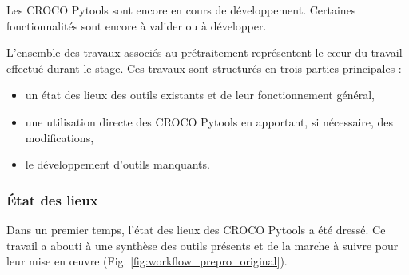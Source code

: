 \documentclass[10pt,a4paper,titlepage]{article}
\begin{document}
    Les CROCO Pytools sont encore en cours de développement. %
    Certaines fonctionnalités sont encore à valider ou à développer.
    
    
    
    L'ensemble des travaux associés au prétraitement représentent le c\oe{}ur du travail effectué durant le stage.
    Ces travaux sont structurés en trois parties principales :
    \begin{itemize}
        \item un état des lieux des outils existants et de leur fonctionnement général,
        \item une utilisation directe des CROCO Pytools en apportant, si nécessaire, des modifications,
        \item le développement d'outils manquants.
    \end{itemize}
    
    \subsubsection{État des lieux}
    \label{subsub:etat_des_lieux}
    
    Dans un premier temps, l'état des lieux des CROCO Pytools a été dressé.
    Ce travail a abouti à une synthèse des outils présents et de la marche à suivre pour leur mise en \oe{}uvre (Fig. \ref{fig:workflow_prepro_original}).
    
\end{document}
